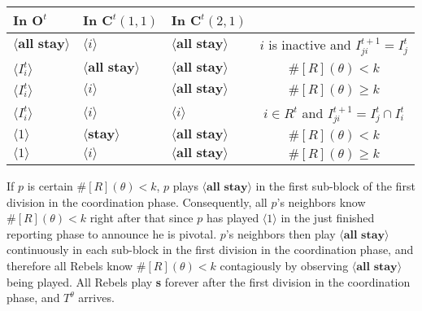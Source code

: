 \documentclass[12pt,letter]{article}
\newcommand{\Kappa}{\mathbf{C}}
\newcommand{\Omicron}{\mathbf{O}}
\theoremstyle{definition}
\theoremstyle{remark}
\theoremstyle{claim}
\begin{document}
\begin{table}[!htbp]
\begin{center}
\begin{tabular}{l l l | c}
\hline
\hline
In $\Omicron^t$			&	In $\Kappa^t(1,1)$			&			In $\Kappa^t(2,1)$		&   \\
\hline
$\langle \textbf{all stay} \rangle$  & $\langle i \rangle$	&  $\langle \textbf{all stay} \rangle$ &  $i$ is inactive and $I^{t+1}_{ji}=I^t_j$  \\
$\langle I^t_{i} \rangle$  & $\langle \textbf{all stay} \rangle$	&  $\langle \textbf{all stay} \rangle$ &  $\#[R](\theta)< k$ \\
$\langle I^t_{i} \rangle$  & $\langle i \rangle$	&  $\langle \textbf{all stay} \rangle$ &  $\#[R](\theta)\geq k$ \\
$\langle I^t_{i} \rangle$  & $\langle i \rangle$	&  $\langle i \rangle$ &  $i\in R^t$ and $I^{t+1}_{ji}=I^t_j\cap I^t_{i}$ \\
$\langle 1 \rangle$  & $\langle \textbf{stay} \rangle$	&	$\langle \textbf{all stay} \rangle$ &  $\#[R](\theta)< k$    \\
$\langle 1 \rangle$  & $\langle i \rangle$	&	$\langle \textbf{all stay} \rangle$ &  $\#[R](\theta)\geq k$  \\
  \hline
\end{tabular}
\end{center}
\end{table}


If $p$ is certain $\#[R](\theta)< k$, $p$ plays $\langle \textbf{all stay} \rangle$ in the first sub-block of the first division in the coordination phase. Consequently, all $p$'s neighbors know $\#[R](\theta)< k$ right after that since $p$ has played $\langle 1 \rangle$ in the just finished reporting phase to announce he is pivotal. $p$'s neighbors then play $\langle \textbf{all stay} \rangle$ continuously in each sub-block in the first division in the coordination phase, and therefore all Rebels know $\#[R](\theta)< k$ contagiously by observing $\langle \textbf{all stay} \rangle$ being played. All Rebels play \textbf{s} forever after the first division in the coordination phase, and $T^{\theta}$ arrives. 
\end{document}
